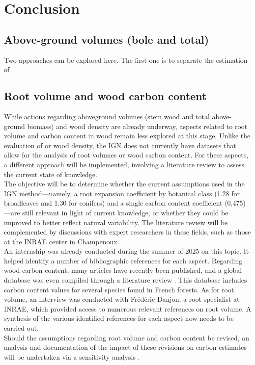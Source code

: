 \chapter{Conclusion\label{chap::conclusion}}

\section{Above-ground volumes (bole and total)}
Two approaches can be explored here. The first one is to separate the estimation of 


\section{Root volume and wood carbon content}

While actions regarding aboveground volumes (stem wood and total above-ground biomass) and wood density are already underway, aspects related to root volume and carbon content in wood remain less explored at this stage. Unlike the evaluation of or wood density, the IGN does not currently have datasets that allow for the analysis of root volumes or wood carbon content. For these aspects, a different approach will be implemented, involving a literature review to assess the current state of knowledge. \\

The objective will be to determine whether the current assumptions used in the IGN method---namely, a root expansion coefficient by botanical class (1.28 for broadleaves and 1.30 for conifers) and a single carbon content coefficient (0.475)---are still relevant in light of current knowledge, or whether they could be improved to better reflect natural variability. The literature review will be complemented by discussions with expert researchers in these fields, such as those at the INRAE center in Champenoux. \\

An internship was already conducted during the summer of 2025 on this topic. It helped identify a number of bibliographic references for each aspect. Regarding wood carbon content, many articles have recently been published, and a global database was even compiled through a literature review \parencite{Doraisami2022}. This database includes carbon content values for several species found in French forests. As for root volume, an interview was conducted with Frédéric Danjon, a root specialist at INRAE, which provided access to numerous relevant references on root volume. A synthesis of the various identified references for each aspect now needs to be carried out. \\

Should the assumptions regarding root volume and carbon content be revised, an analysis and documentation of the impact of these revisions on carbon estimates will be undertaken via a sensitivity analysis \parencite{Iooss2017}.